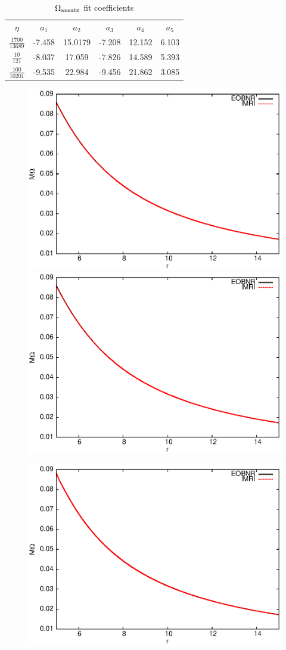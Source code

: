 \begin{table}[ht!]
\centering
\begin{tabular}{c c c c c c}
\hline\hline
  $\eta$& $a_1$ & $a_2$ & $a_3$ & $a_4$ & $ a_5 $  \\  
    $\frac{1700}{13689}$& -7.458 & 15.0179 & -7.208 & 12.152 & 6.103 \\ [1ex]
   $\frac{10}{121}$& -8.037 & 17.059 & -7.826 & 14.589 & 5.393\\ [1ex]
    $\frac{100}{10201}$&-9.535 & 22.984 & -9.456 & 21.862 & 3.085 \\ [1ex]
\hline
\end{tabular}
\caption{\(\Omega_{\rm ansatz}\) fit coefficients}
\label{coef}
\end{table}




\begin{figure}[ht]
\centerline{
\includegraphics[height=0.38\textwidth,  clip]{figures/insimri/rom17100bold}
\includegraphics[height=0.38\textwidth,  clip]{figures/insimri/rom10100bold}
}
\centerline{
\includegraphics[height=0.38\textwidth,  clip]{figures/insimri/rom1100bold}
}
\end{figure}
